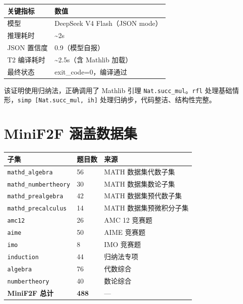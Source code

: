 \documentclass[
  11pt,
  a4paper,
]{ctexrep}
\newcounter{none} %
\begin{document}
{\def\LTcaptype{none} %
\begin{longtable}[]{@{}ll@{}}
\toprule\noalign{}
关键指标 & 数值 \\
\midrule\noalign{}
\endhead
\bottomrule\noalign{}
\endlastfoot
模型 & DeepSeek V4 Flash（JSON mode） \\
推理耗时 & \textasciitilde2s \\
JSON 置信度 & 0.9（模型自报） \\
T2 编译耗时 & \textasciitilde2.5s（含 Mathlib 加载） \\
最终状态 & exit\_code=0，编译通过 \\
\end{longtable}
}

该证明使用归纳法，正确调用了 Mathlib 引理
\texttt{Nat.succ\_mul}。\texttt{rfl}
处理基础情形，\texttt{simp\ {[}Nat.succ\_mul,\ ih{]}}
处理归纳步，代码整洁、结构性完整。

\newpage

\chapter{MiniF2F 涵盖数据集}\label{sec-dataset-detail}

{\def\LTcaptype{none} %
\begin{longtable}[]{@{}lll@{}}
\toprule\noalign{}
子集 & 题目数 & 来源 \\
\midrule\noalign{}
\endhead
\bottomrule\noalign{}
\endlastfoot
\texttt{mathd\_algebra} & 56 & MATH 数据集代数子集 \\
\texttt{mathd\_numbertheory} & 30 & MATH 数据集数论子集 \\
\texttt{mathd\_prealgebra} & 42 & MATH 数据集预代数子集 \\
\texttt{mathd\_precalculus} & 14 & MATH 数据集预微积分子集 \\
\texttt{amc12} & 26 & AMC 12 竞赛题 \\
\texttt{aime} & 50 & AIME 竞赛题 \\
\texttt{imo} & 8 & IMO 竞赛题 \\
\texttt{induction} & 44 & 归纳法专项 \\
\texttt{algebra} & 76 & 代数综合 \\
\texttt{numbertheory} & 40 & 数论综合 \\
\textbf{MiniF2F 总计} & \textbf{488} & --- \\
\end{longtable}
}

\newpage
\end{document}
